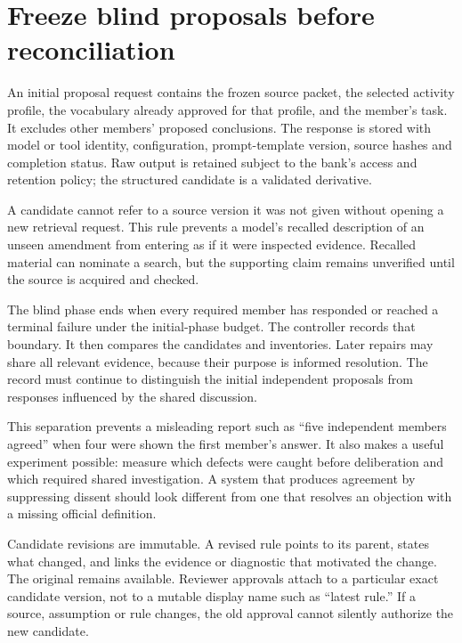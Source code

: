 \section{Freeze blind proposals before reconciliation}
\label{merge:M06:04}


An initial proposal request contains the frozen source packet, the selected
activity profile, the vocabulary already approved for that profile, and the
member's task. It excludes other members' proposed conclusions. The response is
stored with model or tool identity, configuration, prompt-template version, source
hashes and completion status. Raw output is retained subject to the bank's access
and retention policy; the structured candidate is a validated derivative.

A candidate cannot refer to a source version it was not given without opening a
new retrieval request. This rule prevents a model's recalled description of an
unseen amendment from entering as if it were inspected evidence. Recalled
material can nominate a search, but the supporting claim remains unverified
until the source is acquired and checked.


The blind phase ends when every required member has responded or reached a
terminal failure under the initial-phase budget. The controller records that
boundary. It then compares the candidates and inventories. Later repairs may
share all relevant evidence, because their purpose is informed resolution. The
record must continue to distinguish the initial independent proposals from
responses influenced by the shared discussion.

This separation prevents a misleading report such as ``five independent members
agreed'' when four were shown the first member's answer. It also makes a useful
experiment possible: measure which defects were caught before deliberation and
which required shared investigation. A system that produces agreement by
suppressing dissent should look different from one that resolves an objection
with a missing official definition.

Candidate revisions are immutable. A revised rule points to its parent, states
what changed, and links the evidence or diagnostic that motivated the change.
The original remains available. Reviewer approvals attach to a particular
exact candidate version, not to a mutable display name such as ``latest rule.'' If a
source, assumption or rule changes, the old approval cannot silently authorize
the new candidate.


